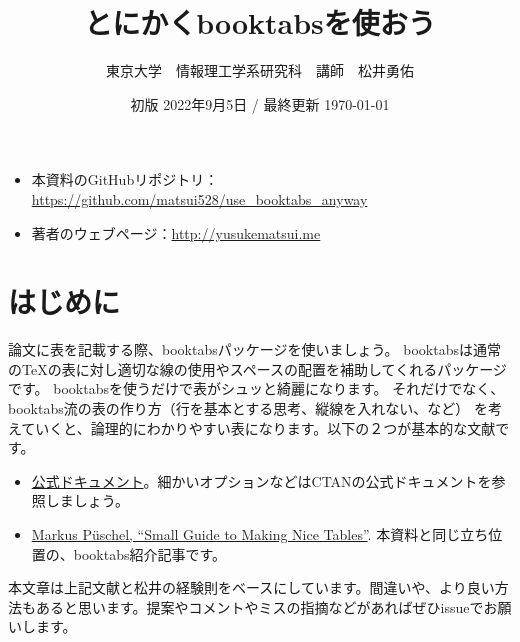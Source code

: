 \documentclass[uplatex,onecolumn,9pt,dvipdfmx]{jsarticle}
\begin{document}
\title{とにかくbooktabsを使おう}
\author{東京大学　情報理工学系研究科　講師　松井勇佑}
\date{初版 2022年9月5日 / 最終更新 \today}
\maketitle

\begin{screen}
    \begin{itemize}
    \item 本資料のGitHubリポジトリ： \url{https://github.com/matsui528/use_booktabs_anyway}
    \item 著者のウェブページ：\url{http://yusukematsui.me}
    \end{itemize}
\end{screen}

\section{はじめに}

論文に表を記載する際、booktabsパッケージを使いましょう。
booktabsは通常のTeXの表に対し適切な線の使用やスペースの配置を補助してくれるパッケージです。
booktabsを使うだけで表がシュッと綺麗になります。
それだけでなく、booktabs流の表の作り方（行を基本とする思考、縦線を入れない、など）
を考えていくと、論理的にわかりやすい表になります。以下の２つが基本的な文献です。
\begin{itemize}
    \item \href{http://mirrors.ctan.org/macros/latex/contrib/booktabs/booktabs.pdf}{公式ドキュメント}。細かいオプションなどはCTANの公式ドキュメントを参照しましょう。
    \item \href{https://people.inf.ethz.ch/markusp/teaching/guides/guide-tables.pdf}{Markus P\"{u}schel, ``Small Guide to Making Nice Tables''}. 本資料と同じ立ち位置の、booktabs紹介記事です。
\end{itemize}
本文章は上記文献と松井の経験則をベースにしています。間違いや、より良い方法もあると思います。提案やコメントやミスの指摘などがあればぜひissueでお願いします。
\end{document}
